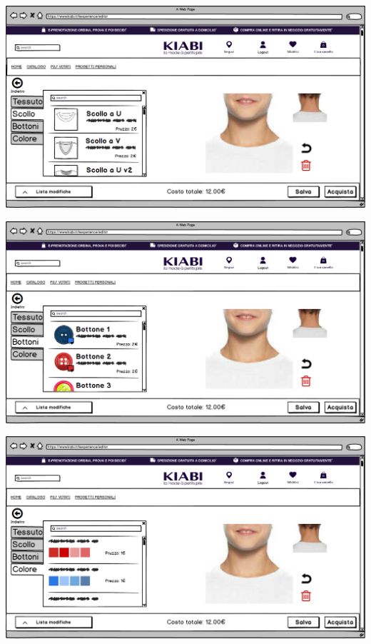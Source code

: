 \documentclass[12pt,italian,]{report}
\begin{document}
\includegraphics{balsamiq/Editor - caratteristica collo scollo.png}


\includegraphics{balsamiq/Editor - caratteristica collo bottoni.png}


\includegraphics{balsamiq/Editor - caratteristica collo colore.png}
\end{document}

